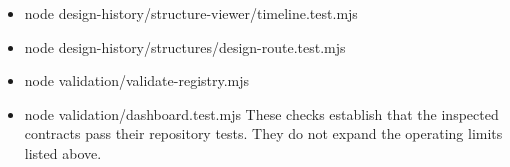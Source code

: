\documentclass[11pt]{article}
\begin{document}
\begin{small}
\begin{itemize}[leftmargin=*]
\item node design-history/structure-viewer/timeline.test.mjs

\end{itemize}

\begin{itemize}[leftmargin=*]

\item node design-history/structures/design-route.test.mjs

\item node validation/validate-registry.mjs

\item node validation/dashboard.test.mjs These checks establish that the inspected contracts pass their repository tests. They do not expand the operating limits listed above.

\end{itemize}

\end{small}
\end{document}
